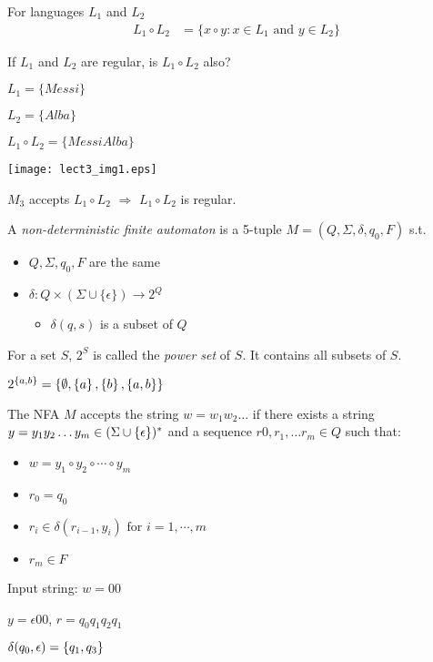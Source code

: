 \begin{definition}
    For languages $L_1$ and $L_2$
    \begin{align*}
        L_1 \circ L_2 &= \{x \circ y: x \in L_1 \text{ and } y \in L_2\}
    \end{align*}
\end{definition}

If $L_1$ and $L_2$ are regular, is $L_1 \circ L_2$ also?

$L_1 = \{Messi\}$

$L_2 = \{Alba\}$

$L_1 \circ L_2 = \{MessiAlba\}$

\begin{unnumfigure}
    \texttt{[image: lect3\_img1.eps]}
\end{unnumfigure}

$M_3$ accepts $L_1 \circ L_2$ $\Rightarrow$ $L_1 \circ L_2$ is regular.

\begin{definition}
    A \emph{non-deterministic finite automaton} is a 5-tuple $M = (Q, \Sigma, \delta, q_0, F)$ s.t.

    \begin{itemize}
        \item $Q, \Sigma, q_0, F$ are the same
        \item $\delta: Q \times (\Sigma \cup \{\epsilon\}) \rightarrow 2^Q$
        \begin{itemize}
            \item $\delta (q, s)$ is a subset of $Q$
        \end{itemize}
    \end{itemize}
\end{definition}

For a set $S$, $2^S$ is called the \emph{power set} of $S$. It contains all subsets of $S$.

$2^{\left \{ a, b \right \}} = \left \{ \emptyset, \left \{ a \right \}, \left \{ b \right \}, \left \{ a, b \right \} \right \}$

\begin{definition}
    The NFA $M$ accepts the string  $w = w_1w_2 \ldots$ if there exists a string $y = y_1y_2 \ldots y_m \in (\Sigma \cup \left \{ \epsilon \right \})^*$  and a sequence $r0, r_1, \ldots r_m \in Q$ such that:

    \begin{itemize}
        \item $w = y_1 \circ y_2 \circ \cdots \circ y_m$
        \item $r_0 = q_0$
        \item $r_i \in \delta (r_{i-1}, y_i) \text{ for } i = 1, \cdots, m$
        \item $r_m \in F$
    \end{itemize}
\end{definition}

Input string: $w = 00$

$y = \epsilon 00$, $r = q_0q_1q_2q_1$

$\delta(q_0, \epsilon) = \left \{ q_1, q_3 \right \}$

\backmatter
